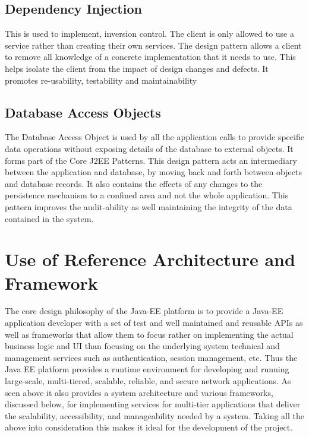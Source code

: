 \documentclass[12pt]{article}
\begin{document}
\subsection{Dependency Injection}
This is used to implement, inversion control. The client is only allowed to use a service rather than creating their own services. The design pattern allows a client to remove all knowledge of a concrete implementation that it needs to use. This helps isolate the client from the impact of design changes and defects. It promotes re-usability, testability and maintainability 

\subsection{Database Access Objects}
The Database Access Object is used by all the application calls to provide specific data operations without exposing details of the database to external objects. It forms part of the Core J2EE Patterns. This design pattern acts an intermediary between the application and database, by moving back and forth between objects and database records. It also contains the effects of any changes to the persistence mechanism to a confined area and not the whole application. This pattern improves the audit-ability as well maintaining the integrity of the data contained in the system. 

\section{Use of Reference Architecture and Framework}
The core design philosophy of the Java-EE platform is to provide a Java-EE application developer with a set of test and well maintained and reusable APIs as well as frameworks that allow them to focus rather on implementing the actual business logic and UI than focusing on the underlying system technical and management services such as authentication, session management, etc. Thus the Java EE platform provides a runtime environment for developing and running large-scale, multi-tiered, scalable, reliable, and secure network applications. As seen above it also provides a system architecture and various frameworks, discussed below, for implementing services for multi-tier applications that deliver the scalability, accessibility, and manageability needed by a system. Taking all the above into consideration this makes it ideal for the development of the project.
\end{document}
